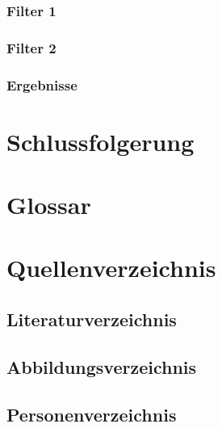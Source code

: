 \documentclass[12pt,a4paper, ngerman]{article}
\begin{document}
\subsubsection{Filter 1}

\subsubsection{Filter 2}

\subsubsection{Ergebnisse}

\section{Schlussfolgerung}




\newpage
\section{Glossar}


\newpage
\section{Quellenverzeichnis}
\subsection{Literaturverzeichnis}
\printbibliography
\subsection{Abbildungsverzeichnis}
\listoffigures
\subsection{Personenverzeichnis}
\end{document}

